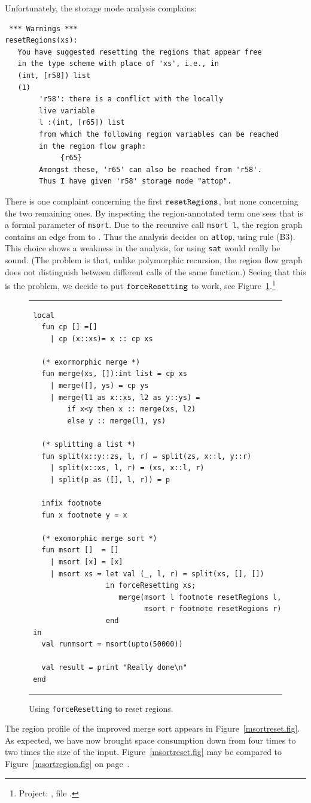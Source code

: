 \documentclass[12pt]{book}
\begin{document}
Unfortunately, the storage mode analysis complains:
\begin{verbatim}
 *** Warnings ***
resetRegions(xs): 
   You have suggested resetting the regions that appear free 
   in the type scheme with place of 'xs', i.e., in
   (int, [r58]) list
   (1)                                                    
        'r58': there is a conflict with the locally
        live variable
        l :(int, [r65]) list
        from which the following region variables can be reached 
        in the region flow graph:
             {r65}
        Amongst these, 'r65' can also be reached from 'r58'.
        Thus I have given 'r58' storage mode "attop".
\end{verbatim}
There is one complaint
concerning the first $\hbox{\tt resetRegions}$, but none concerning the two remaining
ones.  By inspecting the region-annotated term
one sees that  is a formal parameter of
{\tt msort}.  Due to the recursive call {\tt msort l}, the region
graph contains an edge from  to . Thus the
analysis decides on {\tt attop}, using rule (B3). This choice shows a weakness
in the analysis, for using {\tt sat} would really be sound. (The
problem is that, unlike polymorphic recursion, the region flow graph
does not distinguish between different calls of the same function.)
Seeing that this is the problem, we decide to put $\hbox{\tt forceResetting}$ to work,
see Figure~\ref{force.fig}.\footnote{Project:   , file
  .} 
\begin{figure}
\hrule\medskip
\begin{verbatim}
 local
   fun cp [] =[]
     | cp (x::xs)= x :: cp xs

   (* exormorphic merge *)
   fun merge(xs, []):int list = cp xs
     | merge([], ys) = cp ys
     | merge(l1 as x::xs, l2 as y::ys) = 
         if x<y then x :: merge(xs, l2) 
         else y :: merge(l1, ys)

   (* splitting a list *)
   fun split(x::y::zs, l, r) = split(zs, x::l, y::r)
     | split(x::xs, l, r) = (xs, x::l, r)
     | split(p as ([], l, r)) = p

   infix footnote
   fun x footnote y = x

   (* exomorphic merge sort *)
   fun msort []  = []
     | msort [x] = [x]
     | msort xs = let val (_, l, r) = split(xs, [], [])
                  in forceResetting xs;
                     merge(msort l footnote resetRegions l, 
                           msort r footnote resetRegions r)
                  end
 in
   val runmsort = msort(upto(50000))

   val result = print "Really done\n"
 end
\end{verbatim}
\caption{Using {\tt forceResetting} to reset regions.}
\medskip
\hrule
\label{force.fig}
\end{figure}
The region profile of the improved merge sort appears in
Figure~\ref{msortreset.fig}. As expected, we have now brought space
consumption down from four times to two times the size of the input.
Figure~\ref{msortreset.fig} may be compared to
Figure~\ref{msortregion.fig} on page~\pageref{msortregion.fig}.
\end{document}
